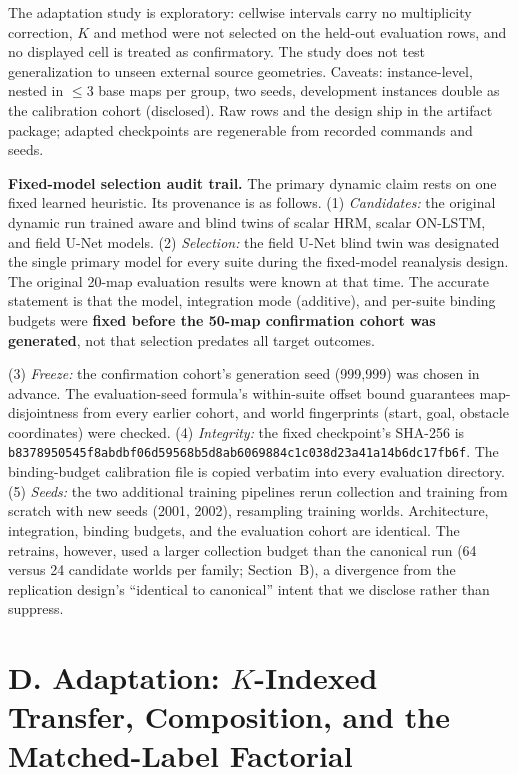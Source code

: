 \documentclass[letterpaper]{article} %
\begin{document}
The adaptation study is exploratory: cellwise intervals carry no multiplicity correction, $K$ and method were not selected on the held-out evaluation rows, and no displayed cell is treated as confirmatory. The study does not test generalization to unseen external source geometries. Caveats: instance-level, nested in $\leq$3 base maps per group, two seeds, development instances double as the calibration cohort (disclosed). Raw rows and the design ship in the artifact package; adapted checkpoints are regenerable from recorded commands and seeds.

\textbf{Fixed-model selection audit trail.} The primary dynamic claim rests on one fixed learned heuristic. Its provenance is as follows. (1) \emph{Candidates:} the original dynamic run trained aware and blind twins of scalar HRM, scalar ON-LSTM, and field U-Net models. (2) \emph{Selection:} the field U-Net blind twin was designated the single primary model for every suite during the fixed-model reanalysis design. The original 20-map evaluation results were known at that time. The accurate statement is that the model, integration mode (additive), and per-suite binding budgets were \textbf{fixed before the 50-map confirmation cohort was generated}, not that selection predates all target outcomes.

(3) \emph{Freeze:} the confirmation cohort's generation seed (999{,}999) was chosen in advance. The evaluation-seed formula's within-suite offset bound guarantees map-disjointness from every earlier cohort, and world fingerprints (start, goal, obstacle coordinates) were checked. (4) \emph{Integrity:} the fixed checkpoint's SHA-256 is \texttt{b8378950545f8abd\allowbreak bf06d59568b5d8ab\allowbreak 6069884c1c038d23\allowbreak a41a14b6dc17fb6f}. The binding-budget calibration file is copied verbatim into every evaluation directory. (5) \emph{Seeds:} the two additional training pipelines rerun collection and training from scratch with new seeds (2001, 2002), resampling training worlds. Architecture, integration, binding budgets, and the evaluation cohort are identical. The retrains, however, used a larger collection budget than the canonical run (64 versus 24 candidate worlds per family; Section~B), a divergence from the replication design's ``identical to canonical'' intent that we disclose rather than suppress.

\clearpage
\section{D. Adaptation: $K$-Indexed Transfer, Composition, and the Matched-Label Factorial}
\end{document}
